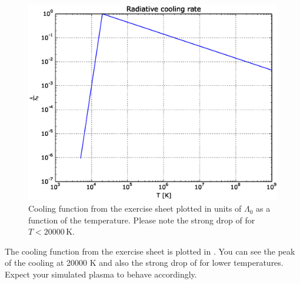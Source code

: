 \documentclass[a4paper,10pt,openany]{article}
\begin{document}
\begin{figure}
\begin{center}
\includegraphics[width=.8\textwidth]{cooling_function.eps}
\end{center}
\caption{Cooling function from the exercise sheet plotted in units of $\Lambda_0$ as a function of the temperature. Please note the strong drop of for $T<20000\,\mathrm{K}$.}\label{fig:cooling function}
\end{figure}

The cooling function from the exercise sheet is plotted in . You can see the peak of the cooling at 20000 K and also the strong drop of for lower temperatures. Expect your simulated plasma to behave accordingly.
\end{document}
